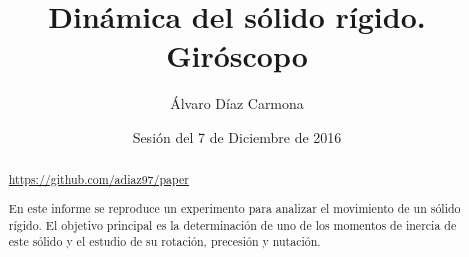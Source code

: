 \documentclass[a4paper]{article}
\begin{document}
\title{Dinámica del sólido rígido. Giróscopo}
\author{Álvaro Díaz Carmona}
\date{Sesión del 7 de Diciembre de 2016}
\maketitle
\begin{abstract}
\url{https://github.com/adiaz97/paper}

En este informe se reproduce un experimento para analizar el movimiento de un sólido rígido. El objetivo principal es la determinación de uno de los momentos de inercia de este sólido y el estudio de su rotación, precesión y nutación.

\end{abstract}
%
\nocite{*}


\end{document}

